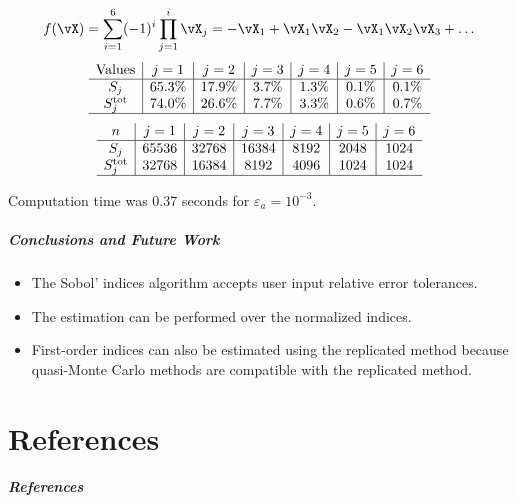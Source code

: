 \documentclass[11pt,compress]{beamer} %
\begin{document}
\begin{frame}
\frametitle{}
\vspace{-0.5cm}
\[
f(\vX)=\sum_{i=1}^6 (-1)^i \prod_{j=1}^i \vX_j=-\vX_1+\vX_1\vX_2-\vX_1\vX_2\vX_3+\dots
\]
\begin{equation*}
\begin{array}{ c | c | c | c | c | c | c }
	\rm{Values} & j=1  &  j=2 &	j=3 &  j=4 &  j=5	& j=6 \\
  \hline			
    S_j & 65.3\%   & 17.9\%   & 3.7\%  &  1.3\%  &  0.1\%  &  0.1\% \\
    S_{j}^{\textup{tot}} & 74.0\%  &  26.6\%  &  7.7\%  &  3.3\%  &  0.6\%  &  0.7\% \\
  \hline  
\end{array}
\end{equation*}
\begin{equation*}
\begin{array}{ c | c | c | c | c | c | c }
	n & j=1  &  j=2 &	j=3 &  j=4 &  j=5	& j=6 \\
  \hline			
    S_j & 65536   & 32768   & 16384  &  8192  &  2048  &  1024 \\
    S_{j}^{\textup{tot}} & 32768  &  16384  &  8192  &  4096  &  1024  &  1024 \\
  \hline  
\end{array}
\end{equation*}

Computation time was 0.37 seconds for $\varepsilon_a=10^{-3}$.
\end{frame}

\begin{frame}
\frametitle{Conclusions and Future Work}
\begin{itemize}
\item The Sobol' indices algorithm accepts user input \alert{relative error} tolerances.
\item The estimation can be performed over the \alert{normalized} indices.
\item First-order indices can also be estimated using the \alert{replicated method} because quasi-Monte Carlo methods are \alert{compatible} with the replicated method.
\end{itemize}
\end{frame}


\part{References}
\begin{frame}[allowframebreaks]\frametitle{References}
\nocite{Owen2013VCG,Sobol01Global,HicJim16a,Nie92}

\end{frame}
\end{document}
